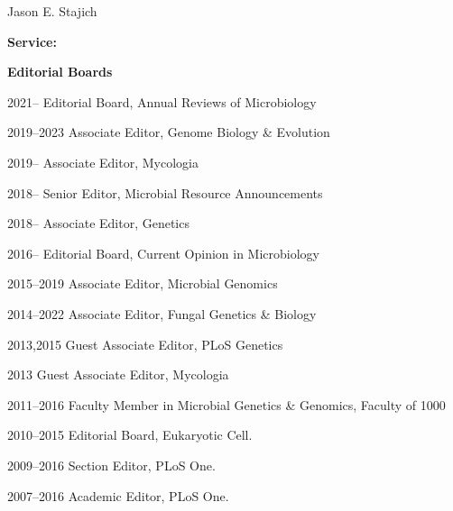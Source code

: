 \documentclass[10pt]{article}
\begin{document}
\begin{cv}{\centerline{Jason E. Stajich}}
\begin{cvlistcompact}{\bf Service:}
\item[{\bf Editorial Boards}]
\item [2021--] Editorial Board, Annual Reviews of Microbiology
\item [2019--2023] Associate Editor, Genome Biology \& Evolution
\item [2019--] Associate Editor, Mycologia
\item [2018--] Senior Editor, Microbial Resource Announcements
\item [2018--] Associate Editor, Genetics
\item [2016--] Editorial Board, Current Opinion in Microbiology
\item [2015--2019] Associate Editor, Microbial Genomics
\item [2014--2022] Associate Editor, Fungal Genetics \& Biology
\item [2013,2015] Guest Associate Editor, PLoS Genetics
\item [2013] Guest Associate Editor, Mycologia
\item [2011--2016] Faculty Member in Microbial Genetics \& Genomics,
  Faculty of 1000
\item [2010--2015] Editorial Board, Eukaryotic Cell.
\item [2009--2016] Section Editor, PLoS One.
\item [2007--2016] Academic Editor, PLoS One.
\\


\end{cvlistcompact}
\end{cv}
\end{document}
